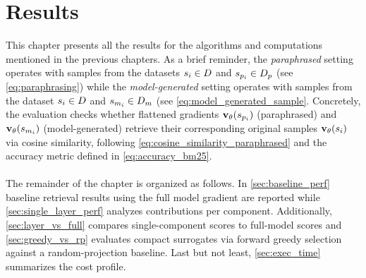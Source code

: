 \chapter{Results}
This chapter presents all the results for the algorithms and computations mentioned in the previous chapters. As a brief reminder, the \emph{paraphrased} setting operates with samples from the datasets $\si \in D$ and $\spi \in D_p$ (see \autoref{eq:paraphrasing}) while the \emph{model-generated} setting operates with samples from the dataset $\si \in D$ and $\smi \in D_m$ (see \autoref{eq:model_generated_sample}. Concretely, the evaluation checks whether flattened gradients $\vXspi[\theta]$ (paraphrased) and $\vXsmi[\theta]$ (model-generated) retrieve their corresponding original samples $\vXsi[\theta]$ via cosine similarity, following \autoref{eq:cosine_similarity_paraphrased} and the accuracy metric defined in \autoref{eq:accuracy_bm25}.
\\\\
The remainder of the chapter is organized as follows. In \autoref{sec:baseline_perf} baseline retrieval results using the full model gradient are reported while \autoref{sec:single_layer_perf} analyzes contributions per component. Additionally, \autoref{sec:layer_vs_full} compares single-component scores to full-model scores and \autoref{sec:greedy_vs_rp} evaluates compact surrogates via forward greedy selection against a random-projection baseline. Last but not least, \autoref{sec:exec_time} summarizes the cost profile.

